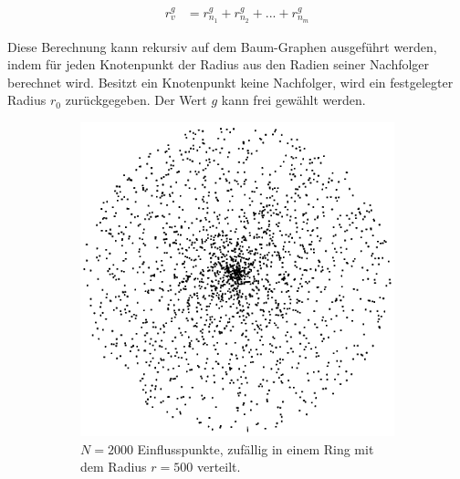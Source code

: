 \begin{equation}
\begin{array}{ll}
r_{v}^g & = r_{n_1}^g + r_{n_2}^g + ... + r_{n_m}^g 
\end{array}
\end{equation} 

Diese Berechnung kann rekursiv auf dem Baum-Graphen ausgeführt werden, indem für jeden Knotenpunkt der Radius aus den Radien seiner Nachfolger berechnet wird. Besitzt ein Knotenpunkt keine Nachfolger, wird ein festgelegter Radius $r_0$ zurückgegeben. \cite[Abschn. 3.5]{LeafVenation:05} Der Wert $g$ kann frei gewählt werden.

\begin{figure} [hbtp]
	\centering
	\begin{subfigure}[t]{.35\textwidth}
		\centering
		\includegraphics[width=\linewidth]{images/SCA_Extended1.png}
		\caption{$N=2000$ Einflusspunkte, zufällig in einem Ring mit dem Radius $r = 500$ verteilt.}
		\label{subfig:SCA_Extended1}
	\end{subfigure}
	\hspace{.1\textwidth}
	\begin{subfigure}[t]{.35\textwidth}
		\centering

\end{subfigure}
\end{figure}
